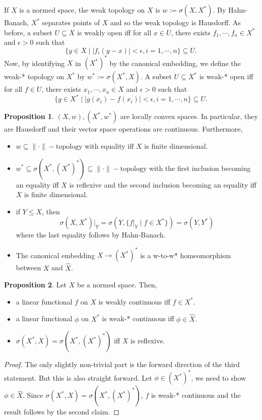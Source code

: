 \documentclass[]{article}
\theoremstyle{definition}
\newtheorem{proposition}{Proposition}[section]
\begin{document}
If \(X\) is a normed space, the weak topology on \(X\) is \(w := \sigma(X, X^*)\). By Hahn-Banach, \(X^*\) 
separates points of \(X\) and so the weak topology is Hausdorff. As before, a subset \(U \subseteq X\) 
is weakly open iff for all \(x \in U\), there exists \(f_1, \cdots, f_n \in X^*\) and \(\epsilon > 0\) 
such that
\[\{y \in X \mid |f_i(y - x)| < \epsilon, i = 1, \cdots, n\} \subseteq U.\]
Now, by identifying \(X\) in \((X^*)^*\) by the canonical embedding, we define the weak-* topology 
on \(X^*\) by \(w^* := \sigma(X^*, X)\). A subset \(U \subseteq X^*\) is weak-* open iff for all
\(f \in U\), there exists \(x_1, \cdots, x_n \in X\) and \(\epsilon > 0\) such that
\[\{g \in X^* \mid |g(x_i) - f(x_i)| < \epsilon, i = 1, \cdots, n\} \subseteq U.\]

\begin{proposition}
  \((X, w), (X^*, w^*)\) are locally convex spaces. In particular, they are Hausdorff and their 
  vector space operations are continuous. Furthermore, 
  \begin{itemize}
    \item \(w \subseteq \|\cdot\|-\text{topology}\) with equality iff \(X\) is finite dimensional.
    \item \(w^* \subseteq \sigma(X^*, (X^*)^*) \subseteq \|\cdot\|-\text{topology}\) with the first 
      inclusion becoming an equality iff \(X\) is reflexive and the second inclusion becoming an
      equality iff \(X\) is finite dimensional.
    \item if \(Y \le X\), then 
      \[\sigma(X, X^*)|_Y = \sigma(Y, \{f|_Y \mid f \in X^*\}) = \sigma(Y, Y^*)\]
      where the last equality follows by Hahn-Banach.
    \item The canonical embedding \(X \to (X^*)^*\) is a w-to-w* homeomorphism between \(X\) 
      and \(\hat X\).
  \end{itemize}
\end{proposition}

\begin{proposition}
  Let \(X\) be a normed space. Then,
  \begin{itemize}
    \item a linear functional \(f\) on \(X\) is weakly continuous iff \(f \in X^*\).
    \item a linear functional \(\phi\) on \(X^*\) is weak-* continuous iff \(\phi \in \hat X\).
    \item \(\sigma(X^*, X) = \sigma(X^*, (X^*)^*)\) iff \(X\) is reflexive.
  \end{itemize}
\end{proposition}
\begin{proof}
  The only slightly non-trivial part is the forward direction of the third statement. But this is 
  also straight forward. Let \(\phi \in (X^*)^*\), we need to show \(\phi \in \hat X\). 
  Since \(\sigma(X^*, X) = \sigma(X^*, (X^*)^*)\), \(f\) is weak-* continuous and the result follows 
  by the second claim.
\end{proof}
\end{document}
